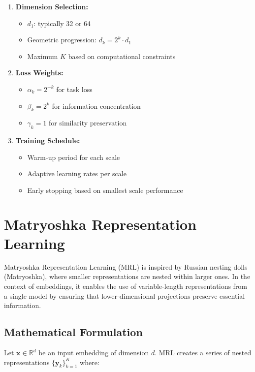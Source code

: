 \begin{enumerate}
    \item \textbf{Dimension Selection:}
    \begin{itemize}
        \item $d_1$: typically 32 or 64
        \item Geometric progression: $d_k = 2^k \cdot d_1$
        \item Maximum $K$ based on computational constraints
    \end{itemize}

    \item \textbf{Loss Weights:}
    \begin{itemize}
        \item $\alpha_k = 2^{-k}$ for task loss
        \item $\beta_k = 2^k$ for information concentration
        \item $\gamma_k = 1$ for similarity preservation
    \end{itemize}

    \item \textbf{Training Schedule:}
    \begin{itemize}
        \item Warm-up period for each scale
        \item Adaptive learning rates per scale
        \item Early stopping based on smallest scale performance
    \end{itemize}
\end{enumerate}



\section{Matryoshka Representation Learning}

Matryoshka Representation Learning (MRL) is inspired by Russian nesting dolls (Matryoshka), where smaller representations are nested within larger ones. In the context of embeddings, it enables the use of variable-length representations from a single model by ensuring that lower-dimensional projections preserve essential information.

\subsection{Mathematical Formulation}

Let $\mathbf{x} \in \mathbb{R}^d$ be an input embedding of dimension $d$. MRL creates a series of nested representations $\{\mathbf{y}_k\}_{k=1}^K$ where:

